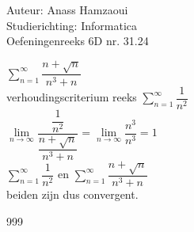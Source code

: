 \documentclass[a4paper]{article}
\begin{document}
  
\noindent \large Auteur: Anass Hamzaoui \\
\noindent \large Studierichting: Informatica \\
\noindent \large Oefeningenreeks 6D nr. 31.24 \\

\medskip

\normalsize

$\displaystyle\sum_{n=1}^\infty \dfrac{n+\sqrt{n}}{n^3 +n}$ \\

verhoudingscriterium reeks $\displaystyle\sum_{n=1}^\infty \dfrac{1}{n^2}$ \\

$\lim\limits_{n \rightarrow \infty} \dfrac{\dfrac{1}{n^2}}{\dfrac{n+\sqrt{n}}{n^3 +n}} = \lim\limits_{n \rightarrow \infty} \dfrac{n^3}{n^3} = 1$ \\

$\displaystyle\sum_{n=1}^\infty \dfrac{1}{n^2}$ en $\displaystyle\sum_{n=1}^\infty \dfrac{n+\sqrt{n}}{n^3 +n}$ \\

beiden zijn dus convergent.

\begin{thebibliography}{999}
\end{thebibliography}
\end{document}
